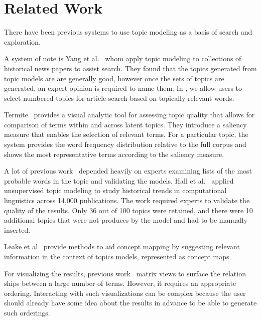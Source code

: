 
\section{Related Work}

There have been previous systems to use topic modeling as a basis of
search and exploration. 

A system of note is Yang et al.~\cite{yang2011topic} whom apply topic modeling to 
collections of historical news papers to assist search. They 
found that the topics generated from topic models are 
are generally good, however once the sets of topics are 
generated, an expert opinion is required to name them. 
In \system, we allow users to select numbered topics for article-search 
based on topically relevant words.



Termite~\cite{2012-termite} provides a visual analytic tool for assessing topic quality that allows for comparison of terms within and across latent topics. They introduce a saliency measure that enables the selection of relevant terms. For a particular topic, the system provides the word frequency distribution relative to the full corpus and shows the most representative terms according to the saliency measure.

A lot of previous work~\cite{chang2009reading,mimno2011optimizing,newman2010evaluating} depended heavily on experts examining lists of the most probable words in the topic and validating the models. Hall et al.~\cite{hall2008studying} applied unsupervised topic modeling to study historical trends in computational linguistics across 14,000 publications. The work required experts  to validate the quality of the results. Only 36 out of 100 topics were retained, and there were 10 additional topics that were not produces by the model and had to be manually inserted.

Leake et al~\cite{leake2003topic} provide methods to aid concept mapping by suggesting relevant information in the context of topics models, represented as concept maps. 

For visualizing the results, previous work~\cite{2012-termite,bertin1983semiology,henry2007matlink} matrix views to surface the relation ships between a large number of terms. However, it requires an appropriate ordering. Interacting with such visualizations can be complex because the user should already have some idea about the results in advance to be able to generate such orderings.






